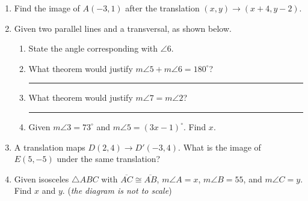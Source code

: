 \documentclass[12pt, twoside]{article}
\begin{document}
\begin{enumerate}
  \item Find the image of $A(-3,1)$ after the translation $(x,y) \rightarrow (x+4,y-2)$.

  \item Given two parallel lines and a transversal, as shown below.
  \begin{center}
  \end{center}
  \begin{enumerate}
    \item State the angle corresponding with $\angle 6$. \vspace{0.5cm}
    \item What theorem would justify $m\angle 5 + m\angle 6 =180^\circ$? \rule{6cm}{0.15mm} \vspace{0.5cm}
    \item What theorem would justify $m\angle 7 = m\angle 2$? \rule{7cm}{0.15mm} \vspace{0.5cm}
    \item Given $m\angle 3 = 73^\circ$ and $m\angle 5 = (3x-1)^\circ$. Find $x$. \vspace{5cm}
  \end{enumerate}

  \item A translation maps $D(2,4) \rightarrow D'(-3,4)$. What is the image of $E(5,-5)$ under the same translation?  \vspace{3.5cm}
  
  \item Given isosceles $\triangle ABC$ with $\overline{AC} \cong \overline{AB}$, $m\angle A = x$, $m\angle B = 55$, and $m\angle C=y$. Find $x$ and $y$. \hfill (\emph{the diagram is not to scale})
  \begin{flushright}
  \end{flushright}


\end{enumerate}
\end{document}
